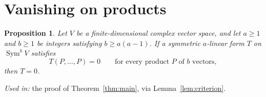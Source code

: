 \documentclass[11pt]{article}
\newtheorem{proposition}[theorem]{Proposition}
\theoremstyle{remark}
\DeclareMathOperator{\Sym}{Sym}
\begin{document}
\section{Vanishing on products}\label{sec:vanishing}

\begin{proposition}\label{prop:vanishing}
Let $V$ be a finite-dimensional complex vector space, and let $a\ge1$ and
$b\ge1$ be integers satisfying $b\ge a(a-1)$.
If a symmetric $a$-linear form $T$ on $\Sym^b V$ satisfies
\begin{equation}\label{eq:diagonal}
 T(P,\ldots,P)=0
 \qquad\text{for every product $P$ of $b$ vectors},
\end{equation}
then $T=0$.
\end{proposition}

\noindent\emph{Used in:} the proof of Theorem~\ref{thm:main}, via
Lemma~\ref{lem:criterion}.
\end{document}
